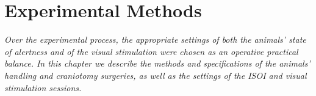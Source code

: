 \chapter{Experimental Methods}
\label{cap:ExperimentalMethods}

\textit{Over the experimental process, the appropriate settings of both the animals' state of alertness and of the visual stimulation were chosen as an operative practical balance. In this chapter we describe the methods and specifications of the animals' handling and craniotomy surgeries, as well as the settings of the ISOI and visual stimulation sessions.}






